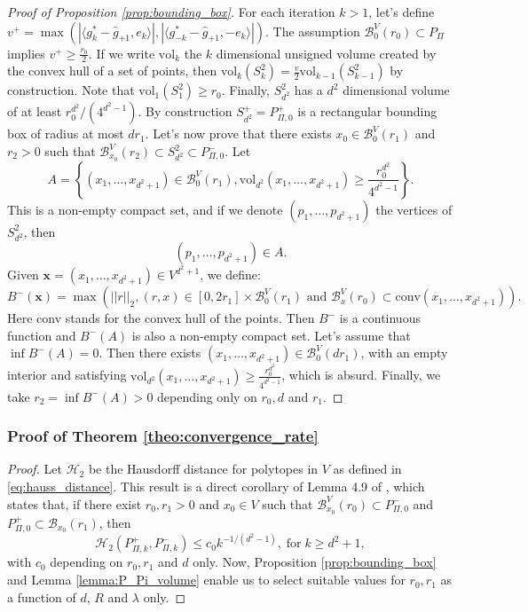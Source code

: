 \documentclass{article}
\newcommand{\B}{\mathcal{B}}
\newcommand{\1}{\mathbf{1}}
\theoremstyle{definition}
\theoremstyle{remark}
\begin{document}
\begin{appendices}
\begin{proof}[Proof of Proposition \ref{prop:bounding_box}]
    For each iteration $k>1$, let's define $v^+=\max(|\langle g^*_{ k}-\hat{g}_{+1},e_k\rangle|, |\langle g^*_{ -k}-\hat{g}_{+1},-e_k\rangle|)$. The assumption $\mathcal{B}^V_{0}(r_0)\subset P_\Pi$ implies $v^+\geq\frac{r_0}{2}$.
    If we write $\mathrm{vol}_k$ the $k$ dimensional unsigned volume created by the convex hull of a set of points, then  $\mathrm{vol}_k(S^2_{k})=\frac{v}{2}\mathrm{vol}_{k-1}(S^2_{k-1})$ by construction. Note that $\mathrm{vol}_1(S^2_{1})\geq r_0$. Finally, $S^2_{d^2}$ has  a $d^2$ dimensional volume of at least $r_0^{d^2}/(4^{d^2-1})$.
    By construction $S^+_{d^2}=P_{\Pi,0}^+$ is a rectangular bounding box of radius at most $dr_1$. 
    Let's now prove that there exists $x_0\in \mathcal{B}^V_{0}(r_1)$ and $r_2>0$ such that $\mathcal{B}^V_{x_0}(r_2)\subset S^2_{d^2}\subset P_{\Pi,0}^-$.\newline
    Let \[A =\left\{(x_1,\dots, x_{d^2+1})\in \mathcal{B}^V_{0}(r_1), \mathrm{vol}_{d^2}(x_1,\dots, x_{d^2+1})\geq \frac{r_0^{d^2}}{4^{d^2-1}}\right\}.\]
    This is a non-empty compact set, and if we denote $(p_1,\dots, p_{d^2+1})$ the vertices of $S^2_{d^2}$, then \[(p_1,\dots, p_{d^2+1})\in A.\] Given $\mathbf{x}=(x_1,\dots, x_{d^2+1})\in V^{d^2+1}$, we define: \[B^-(\mathbf{x})= \max(||r||_2,(r,x)\in[0,2r_1]\times \mathcal{B}^V_{0}(r_1) \text{ and }  \mathcal{B}^V_{x}(r_0)\subset \mathrm{conv}(x_1,\dots, x_{d^2+1})).\]
    Here conv stands for the convex hull of the points.
    Then $B^-$ is a continuous function and $B^-(A)$ is also a non-empty compact set. Let's assume that $\inf B^-(A)=0.$ Then there exists $(x_1,\dots, x_{d^2+1})\in \mathcal{B}^V_{0}(dr_1)$, with an empty interior and satisfying $\mathrm{vol}_{d^2}(x_1,\dots, x_{d^2+1})\geq \frac{r_0^{d^2}}{4^{d^2-1}}$, which is absurd. Finally, we take $r_2=\inf B^-(A)>0$ depending only on $r_0,d$ and $r_1$.
\end{proof}


\subsubsection*{Proof of Theorem \ref{theo:convergence_rate}}
\begin{proof}
    Let $\mathcal{H}_2$ be the Hausdorff distance for polytopes in $V$ as defined in \eqref{eq:hauss_distance}. This result is a direct corollary of Lemma 4.9 of \cite{lammel2023convergence}, which states that, if there exist $r_0,r_1>0$ and $x_0\in V$ such that  $\mathcal{B}^V_{x_0}(r_0)\subset P_{\Pi,0}^-$ and $P_{\Pi,0}^+\subset\B_{x_0}(r_1)$, then 
    \[\mathcal{H}_2(P_{\Pi,k}^+,P_{\Pi,k}^-)\leq c_0k^{-1/(d^2-1)},\;\mathrm{for}\; k\geq d^2+1,\]
    with $c_0$ depending on $r_0,r_1$ and $d$ only. Now, Proposition \ref{prop:bounding_box} and Lemma \ref{lemma:P_Pi_volume} enable us to select suitable values for $r_0,r_1$ as a function of $d$, $R$ and $\lambda$ only.
\end{proof}



\end{appendices}
\end{document}

